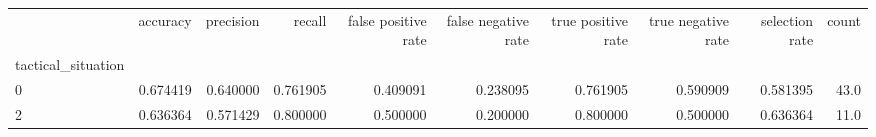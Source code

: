 \begin{tabular}{lrrrrrrrrr}
\toprule
{} &  accuracy &  precision &    recall &  false positive rate &  false negative rate &  true positive rate &  true negative rate &  selection rate &  count \\
tactical\_situation &           &            &           &                      &                      &                     &                     &                 &        \\
\midrule
0                  &  0.674419 &   0.640000 &  0.761905 &             0.409091 &             0.238095 &            0.761905 &            0.590909 &        0.581395 &   43.0 \\
2                  &  0.636364 &   0.571429 &  0.800000 &             0.500000 &             0.200000 &            0.800000 &            0.500000 &        0.636364 &   11.0 \\
\bottomrule
\end{tabular}
